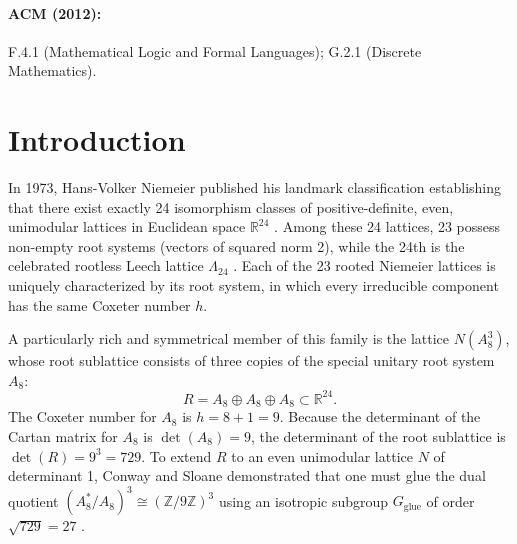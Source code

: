 \documentclass[11pt,a4paper]{article}
\begin{document}
\paragraph{ACM (2012):} F.4.1 (Mathematical Logic and Formal Languages); G.2.1 (Discrete Mathematics).

\newpage

\section{Introduction}

In 1973, Hans-Volker Niemeier published his landmark classification establishing that there exist exactly 24 isomorphism classes of positive-definite, even, unimodular lattices in Euclidean space $\mathbb{R}^{24}$ \cite{niemeier1973}. Among these 24 lattices, 23 possess non-empty root systems (vectors of squared norm 2), while the 24th is the celebrated rootless Leech lattice $\Lambda_{24}$ \cite{conway1999}. Each of the 23 rooted Niemeier lattices is uniquely characterized by its root system, in which every irreducible component has the same Coxeter number $h$.

A particularly rich and symmetrical member of this family is the lattice $N(A_8^3)$, whose root sublattice consists of three copies of the special unitary root system $A_8$:
\begin{equation}
R = A_8 \oplus A_8 \oplus A_8 \subset \mathbb{R}^{24}.
\end{equation}
The Coxeter number for $A_8$ is $h = 8 + 1 = 9$. Because the determinant of the Cartan matrix for $A_8$ is $\det(A_8) = 9$, the determinant of the root sublattice is $\det(R) = 9^3 = 729$. To extend $R$ to an even unimodular lattice $N$ of determinant 1, Conway and Sloane demonstrated that one must glue the dual quotient $(A_8^* / A_8)^3 \cong (\mathbb{Z}/9\mathbb{Z})^3$ using an isotropic subgroup $G_{\text{glue}}$ of order $\sqrt{729} = 27$ \cite{conway1999}.
\end{document}
